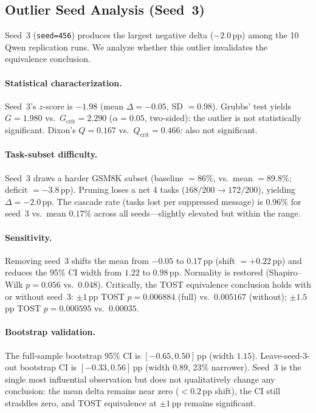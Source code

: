 \subsection{Outlier Seed Analysis (Seed~3)}
\label{app:outlier_seed}

Seed~3 (\texttt{seed=456}) produces the largest negative delta ($-2.0$\,pp)
among the 10 Qwen replication runs. We analyze whether this outlier
invalidates the equivalence conclusion.

\paragraph{Statistical characterization.}
Seed~3's $z$-score is $-1.98$ (mean $\Delta = -0.05$, SD $= 0.98$).
Grubbs' test yields $G = 1.980$ vs.\ $G_{\mathrm{crit}} = 2.290$
($\alpha = 0.05$, two-sided): the outlier is not statistically significant.
Dixon's $Q = 0.167$ vs.\ $Q_{\mathrm{crit}} = 0.466$: also not significant.

\paragraph{Task-subset difficulty.}
Seed~3 draws a harder GSM8K subset (baseline $= 86$\%, vs.\ mean $= 89.8$\%;
deficit $= -3.8$\,pp).
Pruning loses a net 4 tasks ($168/200 \to 172/200$),
yielding $\Delta = -2.0$\,pp.
The cascade rate (tasks lost per suppressed message) is
$0.96$\% for seed~3
vs.\ mean $0.17$\% across all seeds---slightly elevated
but within the range.

\paragraph{Sensitivity.}
Removing seed~3 shifts the mean from $-0.05$ to $0.17$\,pp
(shift $= +0.22$\,pp) and reduces the 95\% CI width from
$1.22$ to $0.98$\,pp.
Normality is restored
(Shapiro--Wilk $p = 0.056$ vs.\ $0.048$).
Critically, the TOST equivalence conclusion holds with or without seed~3:
$\pm 1$\,pp TOST $p = 0.006884$ (full) vs.\ $0.005167$ (without);
$\pm 1.5$\,pp TOST $p = 0.000595$ vs.\ $0.00035$.

\paragraph{Bootstrap validation.}
The full-sample bootstrap 95\% CI is $[-0.65, 0.50]$\,pp
(width $1.15$).
Leave-seed-3-out bootstrap CI is $[-0.33, 0.56]$\,pp
(width $0.89$, 23\% narrower).
Seed~3 is the single most influential observation but does not qualitatively
change any conclusion: the mean delta remains near zero ($<0.2$\,pp shift),
the CI still straddles zero, and TOST equivalence at $\pm 1$\,pp remains significant.

